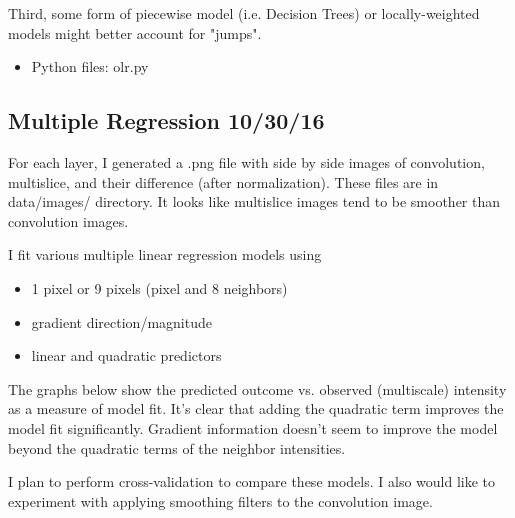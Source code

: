 \documentclass[11pt]{article}
\begin{document}
Third, some form of piecewise model (i.e. Decision Trees) or
locally-weighted models might better account for "jumps".

\begin{itemize}
\item Python files: olr.py
\end{itemize}
\pagebreak
\subsection{Multiple Regression 10/30/16}
\label{sec-1-2}
For each layer, I generated a .png file with side by side images of
convolution, multislice, and their difference (after
normalization). These files are in data/images/ directory.  It looks
like multislice images tend to be smoother than convolution images.

I fit various multiple linear regression models using

\begin{itemize}
\item 1 pixel or 9 pixels (pixel and 8 neighbors)
\item gradient direction/magnitude
\item linear and quadratic predictors
\end{itemize}

The graphs below show the predicted outcome vs. observed (multiscale)
intensity as a measure of model fit. It's clear that adding the
quadratic term improves the model fit significantly. Gradient
information doesn't seem to improve the model beyond the quadratic
terms of the neighbor intensities. 

I plan to perform cross-validation to compare these models. I also
would like to experiment with applying smoothing filters to the
convolution image. 
\pagebreak
\end{document}
